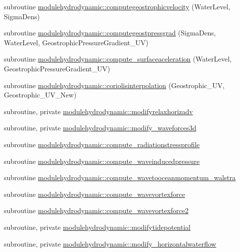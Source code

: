 \begin{DoxyCompactItemize}
\item 
subroutine \mbox{\hyperlink{namespacemodulehydrodynamic_a63098393e35b164bc5c6885e1473058f}{modulehydrodynamic\+::computegeostrophicvelocity}} (Water\+Level, Sigma\+Dens)
\item 
subroutine \mbox{\hyperlink{namespacemodulehydrodynamic_a8db443c5e63483726ac4ce8b9729bbfa}{modulehydrodynamic\+::computegeostpressgrad}} (Sigma\+Dens, Water\+Level, Geostrophic\+Pressure\+Gradient\+\_\+\+UV)
\item 
subroutine \mbox{\hyperlink{namespacemodulehydrodynamic_a6ed1d015329405f39d5cfdf5e7481273}{modulehydrodynamic\+::compute\+\_\+surfaceaceleration}} (Water\+Level, Geostrophic\+Pressure\+Gradient\+\_\+\+UV)
\item 
subroutine \mbox{\hyperlink{namespacemodulehydrodynamic_abfad909cb27f7db4f12b0cd022a34937}{modulehydrodynamic\+::coriolisinterpolation}} (Geostrophic\+\_\+\+UV, Geostrophic\+\_\+\+U\+V\+\_\+\+New)
\item 
subroutine, private \mbox{\hyperlink{namespacemodulehydrodynamic_aec4110455ce119ce9bcf22264816f780}{modulehydrodynamic\+::modifyrelaxhorizadv}}
\item 
subroutine, private \mbox{\hyperlink{namespacemodulehydrodynamic_abb5a03f6dfc75e5c036b503550a4e315}{modulehydrodynamic\+::modify\+\_\+waveforces3d}}
\item 
subroutine \mbox{\hyperlink{namespacemodulehydrodynamic_adfd6bacb2def8a8594fec898fd389d7d}{modulehydrodynamic\+::compute\+\_\+radiationstressprofile}}
\item 
subroutine \mbox{\hyperlink{namespacemodulehydrodynamic_a0b29794a32cb2b809209708245963c8c}{modulehydrodynamic\+::compute\+\_\+waveinducedpressure}}
\item 
subroutine \mbox{\hyperlink{namespacemodulehydrodynamic_ab36d10de7b5652c6443525b564c85d3b}{modulehydrodynamic\+::compute\+\_\+wavetooceanmomentum\+\_\+walstra}}
\item 
subroutine \mbox{\hyperlink{namespacemodulehydrodynamic_a97eb0405fb1ce63e0caa5f1180b47593}{modulehydrodynamic\+::compute\+\_\+wavevortexforce}}
\item 
subroutine \mbox{\hyperlink{namespacemodulehydrodynamic_a933fb31998f4ab5c221e487b96209deb}{modulehydrodynamic\+::compute\+\_\+wavevortexforce2}}
\item 
subroutine, private \mbox{\hyperlink{namespacemodulehydrodynamic_af96ad695325003d3a6068df53933c723}{modulehydrodynamic\+::modifytidepotential}}
\item 
subroutine, private \mbox{\hyperlink{namespacemodulehydrodynamic_a90cfb4d3462f345fb4c6da09ace1521d}{modulehydrodynamic\+::modify\+\_\+horizontalwaterflow}}

\end{DoxyCompactItemize}
